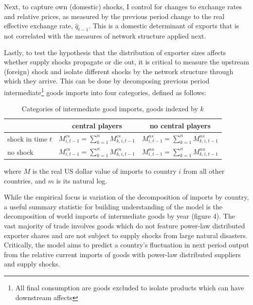 \documentclass[10pt,letterpaper,pdftex]{article}
\begin{document}
Next, to capture own (domestic) shocks, I control for changes to exchange rates and relative prices, as measured by the previous period change to the real effective exchange rate, $\hat{q}_{t-1}$. This is a domestic determinant of exports that is not correlated with the measures of network structure applied next.

Lastly, to test the hypothesis that the distribution of exporter sizes affects whether supply shocks propagate or die out, it is critical to measure the upstream (foreign) shock and isolate different shocks by the network structure through which they arrive. This can be done by decomposing previous period intermediate\footnote{All final consumption are goods excluded to isolate products which can have downstream affects} goods imports into four categories, defined as follows:

\begin{table}[ht]\centering \caption{Categories of intermediate good imports, goods indexed by $k$ \label{mtab}}
	\begin{tabular}{l | c | c}
	\toprule
	 & central players & no central players \\
	 \midrule
	 shock in time $t$ & $M^{cs}_{i,t-1} = \sum_{k=1}^{n} M^{cs}_{k,i,t-1}$ & $M^{ns}_{i,t-1} = \sum_{k=1}^{n}M^{ns}_{k,i,t-1}$ \\
	 \midrule
	 no shock & $M^{cn}_{i,t-1} = \sum_{k=1}^{n} M^{cn}_{k,i,t-1}$ & $M^{nn}_{i,t-1} = \sum_{k=1}^{n}M^{nn}_{k,i,t-1}$ \\
	 \bottomrule
	\end{tabular}
	\end{table}
	
where $M$ is the real US dollar value of imports to country $i$ from all other countries, and $m$ is its natural log.

While the empirical focus is variation of the decomposition of imports by country, a useful summary statistic for building understanding of the model is the decomposition of world imports of intermediate goods by year (figure 4). The vast majority of trade involves goods which do not feature power-law distributed exporter shares and are not subject to supply shocks from large natural disasters. Critically, the model aims to predict a country's fluctuation in next period output from the relative current imports of goods with power-law distributed suppliers and supply shocks.
\end{document}
